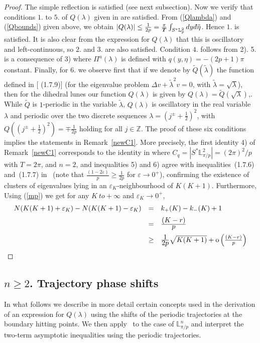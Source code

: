 \documentclass[11pt,a4paper,times]{amsart}
\theoremstyle{plain}
\theoremstyle{definition}
\numberwithin{equation}{section}
\newcommand{\ds}{\displaystyle}
\newcommand{\eqskip}{ \vspace*{2mm}\\ }
\newcommand{\so}{{\rm o}}
\newcommand{\fr}[2]{\frac{\ds #1}{\ds #2}}
\newcommand{\lune}[2]{\mathbb{L}^{#1}_{#2}}
\newcommand{\dbar}{d\hspace*{-0.08em}\bar{}\hspace*{0.1em}}
\begin{document}
{\begin{proof}
The simple reflection is satisfied
 (see next subsection). Now we verify that conditions $1.$ to $5.$ of $Q(\lambda)$ given in \cite[p.53]{sava}  are satisfied.
From (\ref{Qlambda}) and (\ref{Qbounds}) given above,
we obtain $|Q(\lambda)|\leq \frac{1}{2p}= \frac{\pi}{\boldsymbol{T}}
\int_{S^*\lune{2}{p}}dy\dbar\tilde{\eta}$. Hence $1.$ is satisfied. It is also clear from the expression for $Q(\lambda)$ that this is oscillatory  and left-continuous, so $2.$ and $3.$ are also satisfied.  Condition $4.$ follows from 2).   5. is a consequence of 3) where
  $\Pi^a(\lambda)$ is defined with 
  $q(y,\eta)=-(2p+1)\pi$ constant.  
Finally, for $6.$  we observe first that if we denote by
  $\tilde{Q}(\tilde{\lambda})$ the function defined in \cite{sava}[ (1.7.9)]  (for the eigenvalue problem $\Delta v+\tilde{\lambda}^2 v=0$, with
  $\tilde{\lambda}=\sqrt{\lambda}$), then for the dihedral lunes our function $Q(\lambda)$ is given by $ Q(\lambda)=\tilde{Q}(\sqrt{\lambda})$,. While
  $\tilde{Q}$ is $1$-periodic in the variable
  $\tilde{\lambda}$,   $Q(\lambda)$  is oscillatory in the real variable $\lambda$ and periodic over the two discrete sequences
  $\lambda=(j^{\pm}+\frac{1}{2})^2$,  with $Q((j^{\pm}+\frac{1}{2})^2)=\mp\frac{1}{2p}$ holding for all $j\in \mathbb{Z}$. The proof of these six
conditions implies the statements in Remark~\ref{newC1}. More precisely, the first identity 4) of Remark~\ref{newC1}
corresponds to the identity in \cite[Corollary 1.7.9]{sava} where $C_q= |S^*\lune{2}{\pi/p}|=(2\pi)^2/p$ with
$T=2\pi$, and $n=2$, and inequalities 5) and 6) agree with inequalities~(1.7.6) and~(1.7.7) in~\cite{sava}  (note that
$\frac{(1-2\varepsilon)}{p}\geq \frac{1}{2p}$ for $\varepsilon\to 0^+$), confirming the existence of clusters of eigenvalues lying in an
$\varepsilon_K$-neighbourhood of $K(K+1)$.  Furthermore, Using (\ref{mp})  we get for any $K\ to +\infty$ and 
$\varepsilon_K\to 0^+$, 
\begin{eqnarray*}
\begin{array}{lcl}
N( K(K+1)+\varepsilon_K)-N (K(K+1)-\varepsilon_K)
&=& k_+(K)-k_-(K)+1\eqskip
&=&\fr{(K-r)}{p}\eqskip
&\geq & \fr{1}{2p}\sqrt{K(K+1)}
+ \so\left(\frac{(K-r)}{p} \right)
\end{array}
\end{eqnarray*} 
\end{proof}

\subsection{$n\geq 2$. Trajectory phase shifts~\cite{sava}}\label{3shift}
In what follows we describe in more detail certain concepts used in the derivation of an expression for $Q(\lambda)$ using the shifts of the periodic trajectories
at the boundary hitting points. We then apply~\cite[Theorem 1.7.6]{sava} to the case of $\mathbb{L}^n_{\pi/p}$ and interpret the two-term asymptotic inequalities
using the periodic trajectories.


}
\end{document}
